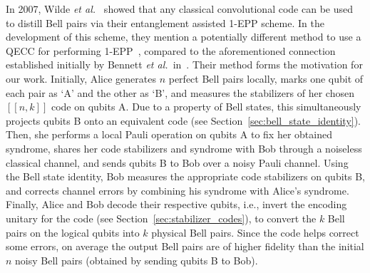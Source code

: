 \documentclass[journal,onecolumn]{IEEEtran}
\newcommand{\etal}{\emph{et al.~}}
\newcommand{\llbr}{[\![}
\newcommand{\rrbr}{]\!]}
\begin{document}
In 2007, Wilde \etal \cite{Wilde-isit10} showed that any classical convolutional code can be used to distill Bell pairs via their entanglement assisted 1-EPP scheme.
In the development of this scheme, they mention a potentially different method to use a QECC for performing 1-EPP~\cite[Section II-D]{Wilde-isit10}, compared to the aforementioned connection established initially by Bennett \etal in~\cite{Bennett-pra96}. 
Their method forms the motivation for our work.
Initially, Alice generates $n$ perfect Bell pairs locally, marks one qubit of each pair as `A' and the other as `B', and measures the stabilizers of her chosen $\llbr n,k \rrbr$ code on qubits A.
Due to a property of Bell states, this simultaneously projects qubits B onto an equivalent code (see Section~\ref{sec:bell_state_identity}).
Then, she performs a local Pauli operation on qubits A to fix her obtained syndrome, shares her code stabilizers and syndrome with Bob through a noiseless classical channel, and sends qubits B to Bob over a noisy Pauli channel.
Using the Bell state identity, Bob measures the appropriate code stabilizers on qubits B, and corrects channel errors by combining his syndrome with Alice's syndrome.
Finally, Alice and Bob decode their respective qubits, i.e., invert the encoding unitary for the code (see Section~\ref{sec:stabilizer_codes}), to convert the $k$ Bell pairs on the logical qubits into $k$ physical Bell pairs.
Since the code helps correct some errors, on average the output Bell pairs are of higher fidelity than the initial $n$ noisy Bell pairs (obtained by sending qubits B to Bob).
\end{document}
